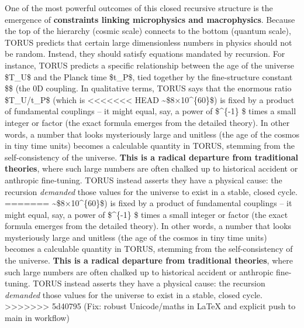\documentclass[]{article}
\begin{document}
One of the most powerful outcomes of this closed recursive structure is
the emergence of \textbf{constraints linking microphysics and
macrophysics}. Because the top of the hierarchy (cosmic scale) connects
to the bottom (quantum scale), TORUS predicts that certain large
dimensionless numbers in physics should not be random. Instead, they
should satisfy equations mandated by recursion. For instance, TORUS
predicts a specific relationship between the age of the universe
\$T\_U\$ and the Planck time \$t\_P\$, tied together by the
fine-structure constant \$\alpha\$ (the 0D coupling. In qualitative terms,
TORUS says that the enormous ratio \$T\_U/t\_P\$ (which is
<<<<<<< HEAD
\textasciitilde\$8×10\^{}\{60\}\$) is fixed by a product of fundamental
couplings -- it might equal, say, a power of \$\alpha\^{}\{-1\} \$ times
a small integer or factor (the exact formula emerges from the detailed
theory). In other words, a number that looks mysteriously large and
unitless (the age of the cosmos in tiny time units) becomes a calculable
quantity in TORUS, stemming from the self-consistency of the universe.
\textbf{This is a radical departure from traditional theories}, where
such large numbers are often chalked up to historical accident or
anthropic fine-tuning. TORUS instead asserts they have a physical cause:
the recursion \emph{demanded} those values for the universe to exist in
a stable, closed cycle\hspace{0pt}.
=======
\textasciitilde{}\$8×10\^{}\{60\}\$) is fixed by a product of
fundamental couplings -- it might equal, say, a power of \$\alpha\^{}\{-1\} \$ times a small integer or factor (the exact formula emerges from
the detailed theory). In other words, a number that looks mysteriously
large and unitless (the age of the cosmos in tiny time units) becomes a
calculable quantity in TORUS, stemming from the self-consistency of the
universe. \textbf{This is a radical departure from traditional
theories}, where such large numbers are often chalked up to historical
accident or anthropic fine-tuning. TORUS instead asserts they have a
physical cause: the recursion \emph{demanded} those values for the
universe to exist in a stable, closed cycle​.
>>>>>>> 5d40795 (Fix: robust Unicode/maths in LaTeX and explicit push to main in workflow)
\end{document}
